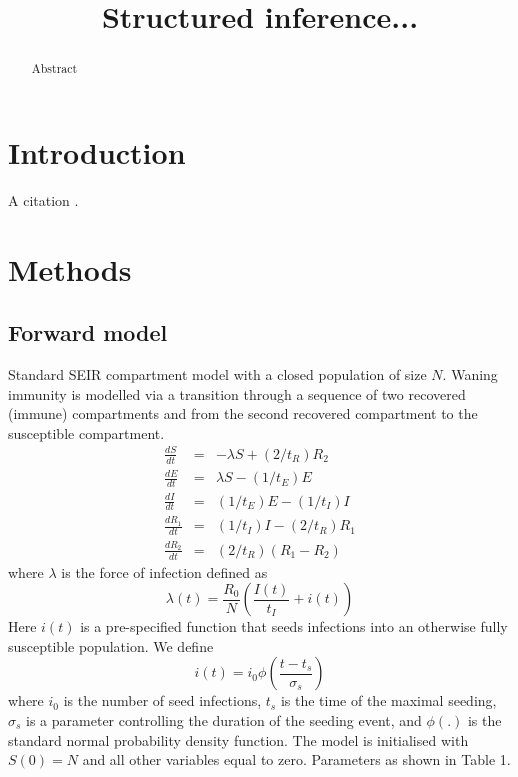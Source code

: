 \documentclass[12pt]{article}
\title{Structured inference...}
\author{}
\date{}
\begin{document}
\linenumbers

\maketitle

\begin{abstract}
Abstract

\end{abstract}

\clearpage


\section*{Introduction}
A citation \cite{lustig2023modelling}.


\section*{Methods}
\subsection*{Forward model}
Standard SEIR compartment model with a closed population of size $N$. Waning immunity is modelled via a transition through a sequence of two recovered (immune) compartments and from the second recovered compartment to the susceptible compartment. 
\begin{eqnarray}
\frac{dS}{dt} &=& -\lambda S + (2/t_R) R_2 \\
\frac{dE}{dt} &=& \lambda S - (1/t_E) E \\
\frac{dI}{dt} &=& (1/t_E) E - (1/t_I) I \\
\frac{dR_1}{dt} &=& (1/t_I) I - (2/t_R) R_1 \\
\frac{dR_2}{dt} &=& (2/t_R) (R_1-R_2) 
\end{eqnarray}
where $\lambda$ is the force of infection defined as
\begin{equation}
    \lambda(t) = \frac{R_0}{N} \left( \frac{I(t)}{t_I} + i(t)\right)
\end{equation}
Here $i(t)$ is a pre-specified function that seeds infections into an otherwise fully susceptible population. We define
\begin{equation}
    i(t) = i_0 \phi\left(\frac{t-t_s}{\sigma_s}\right)
\end{equation}
where $i_0$ is the number of seed infections, $t_s$ is the time of the maximal seeding, $\sigma_s$ is a parameter controlling the duration of the seeding event, and $\phi(.)$ is the standard normal probability density function. The model is initialised with $S(0)=N$ and all other variables equal to zero. Parameters as shown in Table 1.
\end{document}
